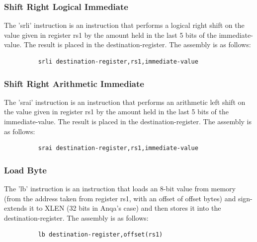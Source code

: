 \subsubsection{Shift Right Logical Immediate}
\qquad
The 'srli' instruction is an instruction that performs a logical right shift on the value given in register rs1 by the amount held in the last 5 bits of the immediate-value. The result is placed in the destination-register. The assembly is as follows:
\begin{figure}[!htbp]
    \centering
    \begin{verbatim}
    srli destination-register,rs1,immediate-value
    \end{verbatim}
\end{figure}\newline

\subsubsection{Shift Right Arithmetic Immediate}
\qquad
The 'srai' instruction is an instruction that performs an arithmetic left shift on the value given in register rs1 by the amount held in the last 5 bits of the immediate-value. The result is placed in the destination-register. The assembly is as follows:
\begin{figure}[!htbp]
    \centering
    \begin{verbatim}
    srai destination-register,rs1,immediate-value
    \end{verbatim}
\end{figure}\newline

\subsubsection{Load Byte}
\qquad
The 'lb' instruction is an instruction that loads an 8-bit value from memory (from the address taken from register rs1, with an offset of offset bytes) and sign-extends it to XLEN (32 bits in Anqa's case) and then stores it into the destination-register. The assembly is as follows:
\begin{figure}[!htbp]
    \centering
    \begin{verbatim}
    lb destination-register,offset(rs1)
    \end{verbatim}
\end{figure}\newline

